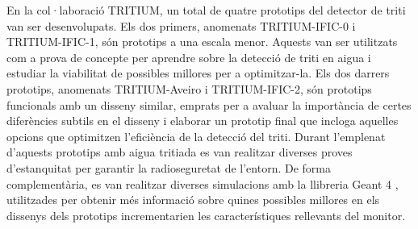 En la col·laboració TRITIUM, un total de quatre prototips del detector de triti van ser desenvolupats. Els dos primers, anomenats TRITIUM-IFIC-0 i TRITIUM-IFIC-1, són prototips a una escala menor. Aquests van ser utilitzats com a prova de concepte per aprendre sobre la detecció de triti en aigua i estudiar la viabilitat de possibles millores per a optimitzar-la. Els dos darrers prototips, anomenats TRITIUM-Aveiro i TRITIUM-IFIC-2, són prototips funcionals amb un disseny similar, emprats per a avaluar la importància de certes diferències subtils en el disseny i elaborar un prototip final que incloga aquelles opcions que optimitzen l'eficiència de la detecció del triti. Durant l'emplenat d'aquests prototips amb aigua tritiada es van realitzar diverses proves d'estanquitat per garantir la radioseguretat de l'entorn. De forma complementària, es van realitzar diverses simulacions amb la llibreria Geant 4 \cite{Geant4WebPage}, utilitzades per obtenir més informació sobre quines possibles millores en els dissenys dels prototips incrementarien les característiques rellevants del monitor.